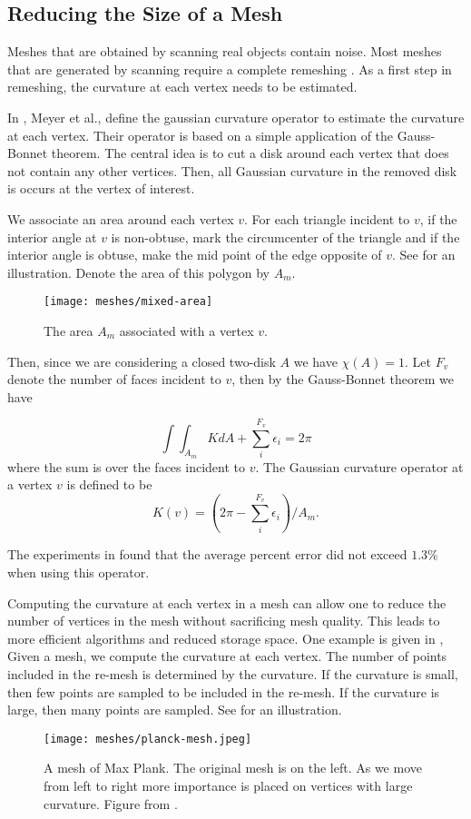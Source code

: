 \subsection{Reducing the Size of a Mesh}
\label{sec:removing}



Meshes that are obtained by scanning real objects contain noise.
Most meshes that are generated by scanning require a complete
remeshing \cite{remeshing-2003}.
As a first step in remeshing, the curvature at each
vertex needs to be estimated.

In \cite{mmsb-2003}, Meyer et al., define the gaussian curvature operator
to estimate the curvature at each vertex. Their operator is 
based on a simple application of the Gauss-Bonnet theorem.
The central idea is to cut a disk around each vertex that does not contain
any other vertices. Then, all Gaussian curvature in the removed
disk is occurs at the vertex of interest.

We associate an area around each vertex $v$. 
For each triangle incident to $v$, if the interior 
angle at $v$ is non-obtuse, mark the circumcenter of the triangle
and if the interior angle is obtuse, make the mid point of the edge
opposite of $v$. See  for an illustration.
Denote the area of this polygon by $A_m.$


\begin{figure}[htb]
\centering
\texttt{[image: meshes/mixed-area]}
\caption{The area $A_m$ associated with a vertex $v$.}
\label{fig:mixed-area}
\end{figure}


Then, since we are considering a closed two-disk $A$ we have $\chi(A)=1$.
Let $F_v$ denote the number of faces incident to $v$, 
then by the Gauss-Bonnet theorem we have

$$\int \int_{A_m}K dA +\sum_i^{F_v} \epsilon_i=2\pi$$
where the sum is over the faces incident to $v$.
The Gaussian curvature operator at a vertex $v$ is defined
to be
$$K(v)=\left( 2\pi -\sum_i^{F_v}\epsilon_i\right)/ A_m.$$

The experiments in \cite{mmsb-2003} found that the average
percent error did not exceed $1.3\%$ when using this operator.

Computing the curvature at each vertex in a mesh can allow one to reduce
the number of vertices in the mesh without sacrificing mesh quality.
This leads to more efficient algorithms and reduced storage space.
One example is given in \cite{alliez-2002},
Given a mesh, we compute the curvature at each vertex.
The number of points included in the re-mesh is determined
by the curvature. If the curvature is small, then few points
are sampled to be included in the re-mesh. If the curvature
is large, then many points are sampled. See 
for an illustration.

\begin{figure}[htb]
\centering
\texttt{[image: meshes/planck-mesh.jpeg]}
\caption{A mesh of Max Plank. The original mesh is on the left. As we move
from left to right more importance is placed on vertices with large curvature.
Figure from \cite{alliez-2002}.}
\label{fig:planck-mesh}
\end{figure}